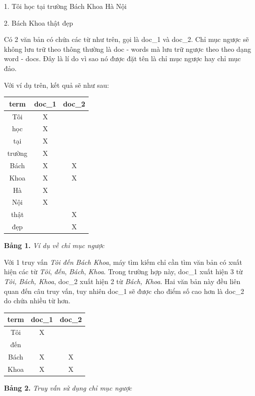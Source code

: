 1. Tôi học tại trường Bách Khoa Hà Nội

2. Bách Khoa thật đẹp
\vspace{0.3cm}

Có 2 văn bản có chứa các từ như trên, gọi là doc\_1 và doc\_2. Chỉ mục ngược sẽ không lưu trữ theo thông thường là doc - words mà lưu trữ ngược theo theo dạng word - docs. Đây là lí do vì sao nó được đặt tên là chỉ mục ngược hay chỉ mục đảo.

Với ví dụ trên, kết quả sẽ như sau:
\begin{center}
\begin{tabular}{||c c c||} 
 \hline
 term & doc\_1 & doc\_2 \\ [0.5ex] 
 \hline\hline
Tôi   &    X  &   \\
học     &   X   & \\
tại   &   X   &   \\
trường     &   X   & \\
Bách   &    X   &  X \\
Khoa    &   X   &  X\\
Hà   &      X  &  \\
Nội      &   X    &  \\
thật  &      &  X\\
đẹp    &      &  X \\[1ex] 
 \hline
\end{tabular}
\end{center}

\begin{center}

\vspace{0.1cm}
\textbf{Bảng 1.} \textit{Ví dụ về chỉ mục ngược}    
\end{center}

Với 1 truy vấn \textit{Tôi đến Bách Khoa}, máy tìm kiếm chỉ cần tìm văn bản có xuất hiện các từ \textit{Tôi}, \textit{đến}, \textit{Bách}, \textit{Khoa}. Trong trường hợp này, doc\_1 xuất hiện 3 từ \textit{Tôi, Bách, Khoa}, doc\_2 xuất hiện 2 từ \textit{Bách, Khoa}. Hai văn bản này đều liên quan đến câu truy vấn, tuy nhiên doc\_1 sẽ được cho điểm số cao hơn là doc\_2 do chứa nhiều từ hơn.
\begin{center}
\begin{tabular}{||c c c||} 
 \hline
 term & doc\_1 & doc\_2 \\ [0.5ex] 
 \hline\hline
Tôi   &    X  &   \\
đến     &      & \\
Bách   &    X   &  X \\
Khoa    &   X   &  X\\[1ex]
 \hline
\end{tabular}
\end{center}
\begin{center}

\vspace{0.1cm}
\textbf{Bảng 2.} \textit{Truy vấn sử dụng chỉ mục ngược}    
\end{center}

